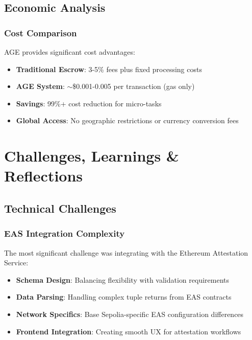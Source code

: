 \documentclass[12pt,a4paper]{article}
\begin{document}
\subsection{Economic Analysis}

\subsubsection{Cost Comparison}

AGE provides significant cost advantages:
\begin{itemize}
    \item \textbf{Traditional Escrow}: 3-5\% fees plus fixed processing costs
    \item \textbf{AGE System}: $\sim$\$0.001-0.005 per transaction (gas only)
    \item \textbf{Savings}: 99\%+ cost reduction for micro-tasks
    \item \textbf{Global Access}: No geographic restrictions or currency conversion fees
\end{itemize}

\section{Challenges, Learnings \& Reflections}

\subsection{Technical Challenges}

\subsubsection{EAS Integration Complexity}
The most significant challenge was integrating with the Ethereum Attestation Service:
\begin{itemize}
    \item \textbf{Schema Design}: Balancing flexibility with validation requirements
    \item \textbf{Data Parsing}: Handling complex tuple returns from EAS contracts
    \item \textbf{Network Specifics}: Base Sepolia-specific EAS configuration differences
    \item \textbf{Frontend Integration}: Creating smooth UX for attestation workflows
\end{itemize}
\end{document}

